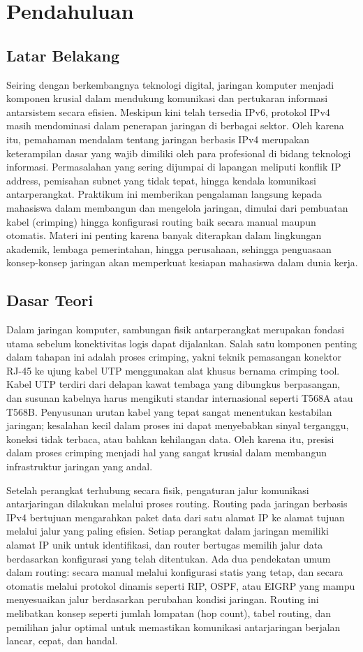 \section{Pendahuluan}
\subsection{Latar Belakang}
Seiring dengan berkembangnya teknologi digital, jaringan komputer menjadi komponen krusial dalam mendukung komunikasi dan pertukaran informasi antarsistem secara efisien. Meskipun kini telah tersedia IPv6, protokol IPv4 masih mendominasi dalam penerapan jaringan di berbagai sektor. Oleh karena itu, pemahaman mendalam tentang jaringan berbasis IPv4 merupakan keterampilan dasar yang wajib dimiliki oleh para profesional di bidang teknologi informasi. Permasalahan yang sering dijumpai di lapangan meliputi konflik IP address, pemisahan subnet yang tidak tepat, hingga kendala komunikasi antarperangkat. Praktikum ini memberikan pengalaman langsung kepada mahasiswa dalam membangun dan mengelola jaringan, dimulai dari pembuatan kabel (crimping) hingga konfigurasi routing baik secara manual maupun otomatis. Materi ini penting karena banyak diterapkan dalam lingkungan akademik, lembaga pemerintahan, hingga perusahaan, sehingga penguasaan konsep-konsep jaringan akan memperkuat kesiapan mahasiswa dalam dunia kerja.

\subsection{Dasar Teori}
Dalam jaringan komputer, sambungan fisik antarperangkat merupakan fondasi utama sebelum konektivitas logis dapat dijalankan. Salah satu komponen penting dalam tahapan ini adalah proses crimping, yakni teknik pemasangan konektor RJ-45 ke ujung kabel UTP menggunakan alat khusus bernama crimping tool. Kabel UTP terdiri dari delapan kawat tembaga yang dibungkus berpasangan, dan susunan kabelnya harus mengikuti standar internasional seperti T568A atau T568B. Penyusunan urutan kabel yang tepat sangat menentukan kestabilan jaringan; kesalahan kecil dalam proses ini dapat menyebabkan sinyal terganggu, koneksi tidak terbaca, atau bahkan kehilangan data. Oleh karena itu, presisi dalam proses crimping menjadi hal yang sangat krusial dalam membangun infrastruktur jaringan yang andal.

Setelah perangkat terhubung secara fisik, pengaturan jalur komunikasi antarjaringan dilakukan melalui proses routing. Routing pada jaringan berbasis IPv4 bertujuan mengarahkan paket data dari satu alamat IP ke alamat tujuan melalui jalur yang paling efisien. Setiap perangkat dalam jaringan memiliki alamat IP unik untuk identifikasi, dan router bertugas memilih jalur data berdasarkan konfigurasi yang telah ditentukan. Ada dua pendekatan umum dalam routing: secara manual melalui konfigurasi statis yang tetap, dan secara otomatis melalui protokol dinamis seperti RIP, OSPF, atau EIGRP yang mampu menyesuaikan jalur berdasarkan perubahan kondisi jaringan. Routing ini melibatkan konsep seperti jumlah lompatan (hop count), tabel routing, dan pemilihan jalur optimal untuk memastikan komunikasi antarjaringan berjalan lancar, cepat, dan handal.

